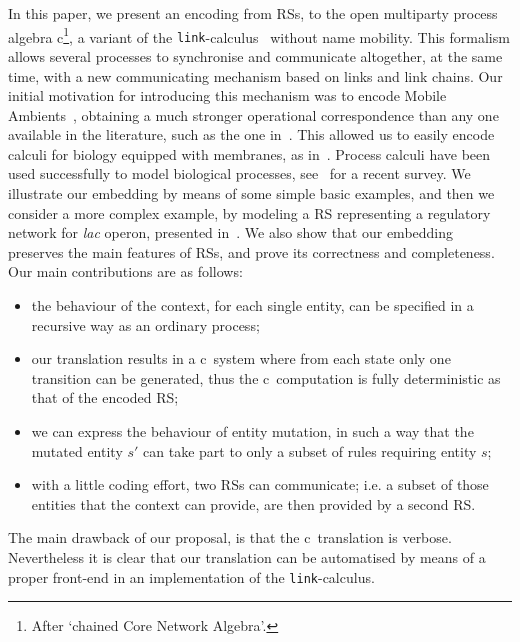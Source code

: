 In this paper, we present an encoding from RSs, 
to the open multiparty process algebra c\CNA\footnote{After `chained Core Network 
Algebra'.}, a variant of the {\tt link}-calculus~\cite{BodeiBB12,BBB17} without name mobility.
This formalism allows several processes to synchronise and 
communicate altogether, at the same time, with a new communicating
mechanism based on links and link chains. 
Our initial motivation for introducing this mechanism was to encode
Mobile Ambients~\cite{CardelliG00}, obtaining a much stronger operational
correspondence than any one available in the literature, such as the one in~\cite{B16}.
 This allowed us to easily encode calculi for biology equipped with membranes, as in~\cite{BodeiBBC14}.
Process calculi have been used successfully to model
biological processes, see~\cite{BBDFH18} for a recent survey.
We illustrate our embedding by means of some simple basic examples,
and then we consider a more complex example, by modeling a RS 
representing a regulatory network for \emph{lac} operon, presented in~\cite{CMMBM12}. We also show that our embedding preserves the main
features of RSs, and prove its correctness and completeness.
Our main contributions are as follows:
\begin{itemize}
\item the behaviour of the context, for each single 
entity,
can be
specified in a recursive way as an ordinary process;
\item 
our translation results in  a  c\CNA \ system where from
each state only one transition can be generated, thus the c\CNA \
computation is fully deterministic as that of the encoded RS;
\item we can express the behaviour of entity mutation,
in such a way that the mutated entity
$s'$ can  take part to only a subset of rules requiring entity $s$;
\item with a little coding effort, two RSs can
communicate; i.e.  a subset of those entities that the context  can
provide, are then provided by a second RS.
\end{itemize}

The main drawback of our proposal, is that the c\CNA \ translation is
verbose. Nevertheless it is clear that our
translation can be automatised by means of a proper front-end in
an implementation of the {\tt link}-calculus.


